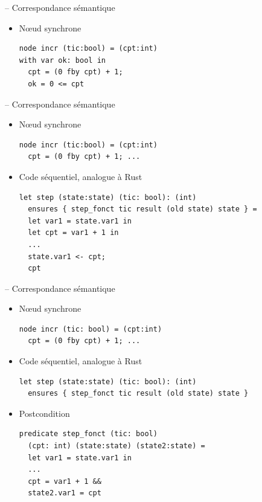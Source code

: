 \documentclass[11pt,usenames,dvipsnames]{beamer}
\begin{document}
\begin{frame}[fragile]{-- Correspondance sémantique}
\begin{itemize}
\item Nœud synchrone
  \begin{lstlisting}[language=minils]
node incr (tic:bool) = (cpt:int)
with var ok: bool in
  cpt = (0 fby cpt) + 1;
  ok = 0 <= cpt\end{lstlisting}
  \end{itemize}
\end{frame}

\begin{frame}[fragile]{-- Correspondance sémantique}
\begin{itemize}
\item Nœud synchrone
  \begin{lstlisting}[language=minils]
node incr (tic:bool) = (cpt:int)
  cpt = (0 fby cpt) + 1; ...\end{lstlisting}
\item Code séquentiel, analogue à Rust
  \begin{lstlisting}[language=why3]
let step (state:state) (tic: bool): (int)
  ensures { step_fonct tic result (old state) state } =
  let var1 = state.var1 in
  let cpt = var1 + 1 in
  ...
  state.var1 <- cpt;
  cpt
  \end{lstlisting}
\end{itemize}
\end{frame}

\begin{frame}[fragile]{-- Correspondance sémantique}
\begin{itemize}
\item Nœud synchrone
  \begin{lstlisting}[language=minils]
node incr (tic: bool) = (cpt:int)
  cpt = (0 fby cpt) + 1; ...\end{lstlisting}
\item Code séquentiel, analogue à Rust
  \begin{lstlisting}[language=why3]
let step (state:state) (tic: bool): (int)
  ensures { step_fonct tic result (old state) state }\end{lstlisting}
\item Postcondition
  \begin{lstlisting}[language=why3]
predicate step_fonct (tic: bool)
  (cpt: int) (state:state) (state2:state) =
  let var1 = state.var1 in
  ...
  cpt = var1 + 1 &&
  state2.var1 = cpt\end{lstlisting}
\end{itemize}
\end{frame}
\end{document}
